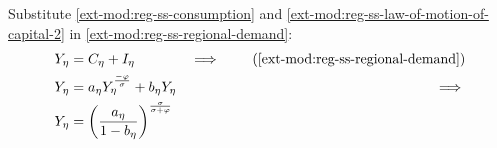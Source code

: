 \documentclass[../thesis.tex]{subfiles}
\begin{document}

Substitute \ref{ext-mod:reg-ss-consumption} and \ref{ext-mod:reg-ss-law-of-motion-of-capital-2} in \ref{ext-mod:reg-ss-regional-demand}:
\begin{alignat}{2}
	Y_{\eta} &= C_{\eta} + I_{\eta} &\implies \tag{\ref{ext-mod:reg-ss-regional-demand}} \\
	Y_{\eta} &= a_{\eta} Y_{\eta}^{\frac{-\varphi}{\sigma}} + b_{\eta} Y_{\eta} &\implies \nonumber \\
	Y_{\eta} &= \left( \frac{a_{\eta}}{1 - b_{\eta}} \right)^{\frac{\sigma}{\sigma + \varphi}} \label{ext-mod:reg-ss-yn}
\end{alignat}


\begin{comment}
	
	Substitute \ref{ext-mod:reg-ss-int-good-firm-FOC-Kt-2} in \ref{ext-mod:reg-ss-law-of-motion-for-capital}:
	\begin{align}
		I_{\eta} &= \delta K_{\eta} \implies I_{\eta} = \delta {\alpha_{\eta}} \frac{\Lambda_{}}{R_K} Y_{\eta} \implies \tag{\ref{ext-mod:reg-ss-law-of-motion-for-capital}} \\
		I_{\eta} &= b_{\eta} Y_{\eta} \label{ext-mod:reg-ss-investment} \\
		& \text{where:} \quad b_{\eta} = \delta {\alpha_{\eta}} \frac{\Lambda_{}}{R_K} \label{ext-mod:reg-ss-b-eta}
	\end{align}
	
\end{comment}

\end{document}

